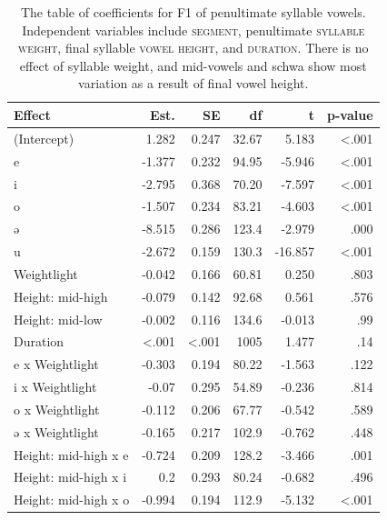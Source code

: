 \documentclass[12pt]{ouparticle}
\begin{document}
\begin{table}[h!]
\centering
\caption{The table of coefficients for F1 of penultimate syllable vowels. Independent variables include \textsc{segment}, penultimate \textsc{syllable weight}, final syllable \textsc{vowel height}, and \textsc{duration}. There is no effect of syllable weight, and mid-vowels and schwa show most variation as a result of final vowel height.}

\label{tab:Syll2f1_harmony}
\renewcommand{\arraystretch}{0.5}%
\begin{tabular}{l | r r r r r}
Effect & Est. & SE & df & t & p-value\\
\hline
(Intercept)          &  1.282  & 0.247  & 32.67    & 5.183   & <.001\\
e                    &  -1.377 & 0.232  & 94.95    & -5.946  & <.001\\
i                    &  -2.795 & 0.368  & 70.20    & -7.597  & <.001\\
o                    &  -1.507 & 0.234  & 83.21    & -4.603  & <.001\\
ə                    &  -8.515 & 0.286  & 123.4    & -2.979  & .000 \\
u                    &  -2.672 & 0.159  & 130.3    & -16.857 & <.001\\
Weightlight          &  -0.042 & 0.166  & 60.81    & 0.250   & .803     \\ 
Height: mid-high     &  -0.079 & 0.142  & 92.68    & 0.561  & .576    \\
Height: mid-low      &  -0.002 & 0.116  & 134.6    & -0.013  & .99    \\
Duration             &  <.001  & <.001  & 1005     & 1.477   & .14 \\
e x Weightlight      &  -0.303 & 0.194  & 80.22    & -1.563  & .122 \\ 
i x Weightlight      &  -0.07  & 0.295  & 54.89    & -0.236  & .814    \\
o x Weightlight      &  -0.112 & 0.206  & 67.77    & -0.542  & .589    \\
ə x Weightlight      &  -0.165 & 0.217  & 102.9    & -0.762  & .448  \\
Height: mid-high x e &  -0.724 & 0.209  & 128.2    & -3.466  & .001\\
Height: mid-high x i &   0.2   & 0.293  & 80.24    & -0.682  & .496  \\  
Height: mid-high x o &  -0.994 & 0.194  & 112.9    & -5.132  & <.001\\

\end{tabular}
\end{table}
\end{document}
